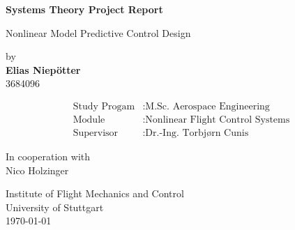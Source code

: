 \documentclass[10pt,a4paper,titlepage]{article}
\begin{document}
\pagestyle{fancy}

\setlength{\parindent}{0pt}



\begin{titlepage}
	
	\begin{center}
        \vspace*{1cm}
            
        \huge
        \textbf{Systems Theory Project Report}
            
        \vspace{0.25cm}
        \LARGE
        Nonlinear Model Predictive Control Design
            
        \vspace{1.5cm}
            

		\Large
		by\\
        \textbf{Elias Niepötter}\\
		3684096

		\vspace{2.5cm}

		\large
		\begin{align*}
			\text{Study Progam}&: \text{M.Sc. Aerospace Engineering}\\[0pt]
			\text{Module}&: \text{Nonlinear Flight Control Systems}\\[0pt]
			\text{Supervisor}&: \text{Dr.-Ing. Torbjørn Cunis}
		\end{align*}


        \vfill

		\large
		In cooperation with\\%
		Nico Holzinger
            
        \vspace{0.8cm}
            
        \large
        Institute of Flight Mechanics and Control\\
        University of Stuttgart\\
        \today
	\end{center}
\end{titlepage}
\end{document}
